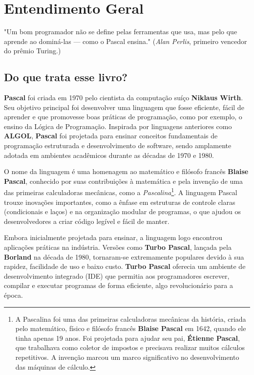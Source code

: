 \chapter{Entendimento Geral}

\begin{remark}
"Um bom programador não se define pelas ferramentas que usa, mas pelo que aprende ao dominá-las — como o Pascal ensina." (\textit{Alan Perlis}, primeiro vencedor do prêmio Turing.) 
\end{remark}

\section{Do que trata esse livro?}
\textbf{Pascal} foi criada em 1970 pelo cientista da computação suíço \textbf{Niklaus Wirth}. Seu objetivo principal foi desenvolver uma linguagem que fosse eficiente, fácil de aprender e que promovesse boas práticas de programação, como por exemplo, o ensino da Lógica de Programação. Inspirada por linguagens anteriores como \textbf{ALGOL}, \textbf{Pascal} foi projetada para ensinar conceitos fundamentais de programação estruturada e desenvolvimento de software, sendo amplamente adotada em ambientes acadêmicos durante as décadas de 1970 e 1980.

O nome da linguagem é uma homenagem ao matemático e filósofo francês \textbf{Blaise Pascal}, conhecido por suas contribuições à matemática e pela invenção de uma das primeiras calculadoras mecânicas, como a \textit{Pascalina}\footnote{A Pascalina foi uma das primeiras calculadoras mecânicas da história, criada pelo matemático, físico e filósofo francês \textbf{Blaise Pascal} em 1642, quando ele tinha apenas 19 anos. Foi projetada para ajudar seu pai, \textbf{Étienne Pascal}, que trabalhava como coletor de impostos e precisava realizar muitos cálculos repetitivos. A invenção marcou um marco significativo no desenvolvimento das máquinas de cálculo.}. A linguagem Pascal trouxe inovações importantes, como a ênfase em estruturas de controle claras (condicionais e laços) e na organização modular de programas, o que ajudou os desenvolvedores a criar código legível e fácil de manter.

Embora inicialmente projetada para ensinar, a linguagem logo encontrou aplicações práticas na indústria. Versões como \textbf{Turbo Pascal}, lançada pela \textbf{Borland} na década de 1980, tornaram-se extremamente populares devido à sua rapidez, facilidade de uso e baixo custo. \textbf{Turbo Pascal} oferecia um ambiente de desenvolvimento integrado (IDE) que permitia aos programadores escrever, compilar e executar programas de forma eficiente, algo revolucionário para a época.

